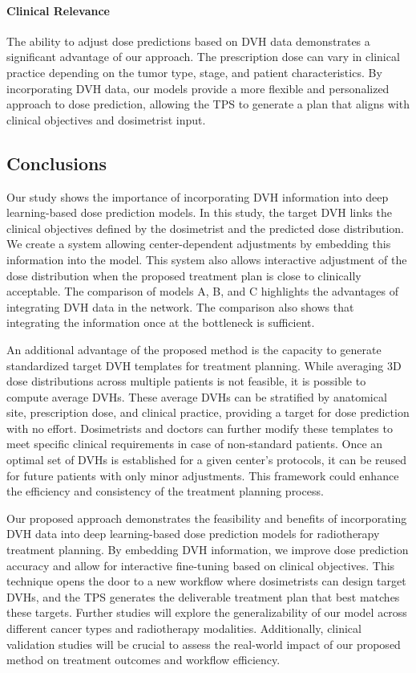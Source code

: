 \paragraph{Clinical Relevance}
The ability to adjust dose predictions based on DVH data demonstrates a significant advantage of our approach.
The prescription dose can vary in clinical practice depending on the tumor type, stage, and patient characteristics.
By incorporating DVH data, our models provide a more flexible and personalized approach to dose prediction, allowing the TPS to generate a plan that aligns with clinical objectives and dosimetrist input.

\subsection{Conclusions}
Our study shows the importance of incorporating DVH information into deep learning-based dose prediction models.
In this study, the target DVH links the clinical objectives defined by the dosimetrist and the predicted dose distribution.
We create a system allowing center-dependent adjustments by embedding this information into the model.
This system also allows interactive adjustment of the dose distribution when the proposed treatment plan is close to clinically acceptable.
The comparison of models A, B, and C highlights the advantages of integrating DVH data in the network.
The comparison also shows that integrating the information once at the bottleneck is sufficient.

An additional advantage of the proposed method is the capacity to generate standardized target DVH templates for treatment planning.
While averaging 3D dose distributions across multiple patients is not feasible, it is possible to compute average DVHs.
These average DVHs can be stratified by anatomical site, prescription dose, and clinical practice, providing a target for dose prediction with no effort.
Dosimetrists and doctors can further modify these templates to meet specific clinical requirements in case of non-standard patients.
Once an optimal set of DVHs is established for a given center's protocols, it can be reused for future patients with only minor adjustments.
This framework could enhance the efficiency and consistency of the treatment planning process.

Our proposed approach demonstrates the feasibility and benefits of incorporating DVH data into deep learning-based dose prediction models for radiotherapy treatment planning.
By embedding DVH information, we improve dose prediction accuracy and allow for interactive fine-tuning based on clinical objectives.
This technique opens the door to a new workflow where dosimetrists can design target DVHs, and the TPS generates the deliverable treatment plan that best matches these targets.
Further studies will explore the generalizability of our model across different cancer types and radiotherapy modalities.
Additionally, clinical validation studies will be crucial to assess the real-world impact of our proposed method on treatment outcomes and workflow efficiency.



